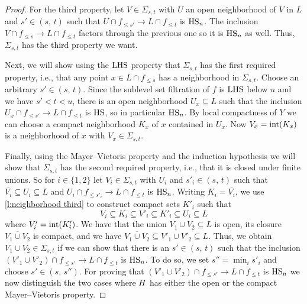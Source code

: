 \begin{proof}
	For the third property, let $V \in \Sigma_{s,t}$ with $U$ an open neighborhood of $\overline{V}$ in $L$ and $s' \in (s,\, t)$ such that
	$U \cap f_{\leq s'} \to L \cap f_{\leq t}$
	is $\mathrm{HS}_n$.
	The inclusion
	$V \cap f_{\leq s} \to L \cap f_{\leq t}$
	factors through the previous one so it is $\mathrm{HS}_n$ as well.
	Thus, $\Sigma_{s, t}$ has the third property we want.

	Next, we will show using the $\mathrm{LHS}$ property that $\Sigma_{s, t}$ has the first required property, i.e., that any point $x \in L \cap f_{\leq s}$ has a neighborhood in $\Sigma_{s, t}$.
	Choose an arbitrary $s' \in (s,\, t)$.
	Since the sublevel set filtration of $f$ is $\mathrm{LHS}$ below $u$ and we have $s' < t < u$, there is an open neighborhood $U_x \subseteq L$ such that the inclusion
	$U_x \cap f_{\leq s'} \to L \cap f_{\leq t}$
	is $\mathrm{HS}$, so in particular $\mathrm{HS}_n$.
	By local compactness of $Y$ we can choose a compact neighborhood $K_x$ of $x$ contained in $U_x$.
	Now $V_x = \operatorname{int} (K_x)$ is a neighborhood of $x$ with $V_x \in \Sigma_{s,t}$.

	Finally, using the Mayer--Vietoris property and the induction hypothesis we will show that $\Sigma_{s,t}$ has the second required property, i.e., that it is closed under finite unions.
	So for $i \in \{1, 2\}$ let $V_i \in \Sigma_{s,t}$ with $U_i$ and $s'_i \in (s,\, t)$ such that
	$\overline{V_i} \subseteq U_i \subseteq L$
	and
	$U_{i} \cap f_{\leq s'_i} \to L \cap f_{\leq t}$
	is $\mathrm{HS}_n$.
	Writing $K_i = \overline{V_i}$, we use \cref{l:neighborhood third} to construct compact sets $K'_i$ such that
	\begin{equation*}
	V_i \subseteq K_i \subseteq V'_i \subseteq K'_i \subseteq U_i \subseteq L
	\end{equation*}
	where $V'_i = \operatorname{int}(K'_i)$.
	We have that the union $V_1 \cup V_2 \subseteq L$ is open, its closure $\overline{V_1 \cup V_2}$ is compact, and we have $\overline{V_1 \cup V_2} \subseteq V'_1 \cup V'_2 \subseteq L$.
	Thus, we obtain $V_1 \cup V_2 \in \Sigma_{s,t}$ if we can show that there is an $s' \in (s,\, t)$ such that the inclusion
	$\left(V'_1 \cup V'_2 \right) \cap f_{\leq s'} \to L \cap f_{\leq t}$
	is $\mathrm{HS}_n$.
	To do so, we set $s'' = \min_i s'_i$ and choose $s' \in (s,\, s'')$.
	For proving that $\left(V'_1 \cup V'_2 \right) \cap f_{\leq s'} \to L \cap f_{\leq t}$ is $\mathrm{HS}_n$ we now distinguish the two cases where $H$ has either the open or the compact Mayer--Vietoris property.


\end{proof}
